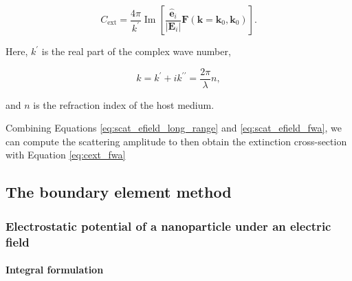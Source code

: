\begin{equation} \label{eq:cext_fwa}
    C_\text{ext} = \frac{4\pi}{k^\prime} \operatorname{Im} \left[ \frac{\mathbf{\hat{e}}_i}{|\mathbf{E}_i|}\mathbf{F}(\mathbf{k}=\mathbf{k}_0, \mathbf{k}_0) \right].
\end{equation}

\noindent Here, $k^\prime$ is the real part of the complex wave number, 

\begin{equation}
    k = k^\prime + ik^{\prime\prime} = \frac{2\pi}{\lambda} n,
\end{equation}

\noindent and $n$ is the refraction index of the host medium.

Combining Equations \eqref{eq:scat_efield_long_range} and \eqref{eq:scat_efield_fwa},
we can compute the scattering amplitude to then obtain the extinction cross-section 
with Equation \eqref{eq:cext_fwa}


\subsection{The boundary element method} \label{sec:lspr_bem}

\subsubsection{Electrostatic potential of a nanoparticle under an electric field} \label{sec:pot_elec_field}

\paragraph{Integral formulation}

